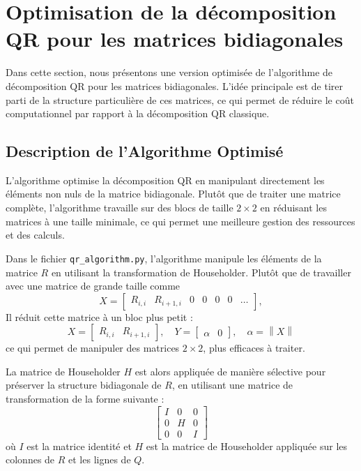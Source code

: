 \documentclass{article}
\begin{document}
\section{Optimisation de la décomposition QR pour les matrices bidiagonales}

Dans cette section, nous présentons une version optimisée de l'algorithme de décomposition QR pour les matrices bidiagonales. L'idée principale est de tirer parti de la structure particulière de ces matrices, ce qui permet de réduire le coût computationnel par rapport à la décomposition QR classique.

\subsection{Description de l'Algorithme Optimisé}

L'algorithme optimise la décomposition QR en manipulant directement les éléments non nuls de la matrice bidiagonale. Plutôt que de traiter une matrice complète, l'algorithme travaille sur des blocs de taille \( 2 \times 2 \) en réduisant les matrices à une taille minimale, ce qui permet une meilleure gestion des ressources et des calculs.

Dans le fichier \texttt{qr\_algorithm.py}, l'algorithme manipule les éléments de la matrice \( R \) en utilisant la transformation de Householder. Plutôt que de travailler avec une matrice de grande taille comme
\[
X = \begin{bmatrix} R_{i,i} & R_{i+1,i} & 0 & 0 & 0 & 0 & \dots \end{bmatrix},
\]
Il réduit cette matrice à un bloc plus petit :
\[
X = \begin{bmatrix} R_{i,i} & R_{i+1,i} \end{bmatrix}, \quad Y = \begin{bmatrix} \alpha & 0 \end{bmatrix}, \quad \alpha = \left\lVert X \right\rVert
\]
ce qui permet de manipuler des matrices \( 2 \times 2 \), plus efficaces à traiter.


La matrice de Householder \( H \) est alors appliquée de manière sélective pour préserver la structure bidiagonale de \( R \), en utilisant une matrice de transformation de la forme suivante :
\[
\begin{bmatrix}
I & 0 & 0 \\
0 & H & 0 \\
0 & 0 & I
\end{bmatrix}
\]
où \( I \) est la matrice identité et \( H \) est la matrice de Householder appliquée sur les colonnes de \( R \) et les lignes de \( Q \).
\end{document}

